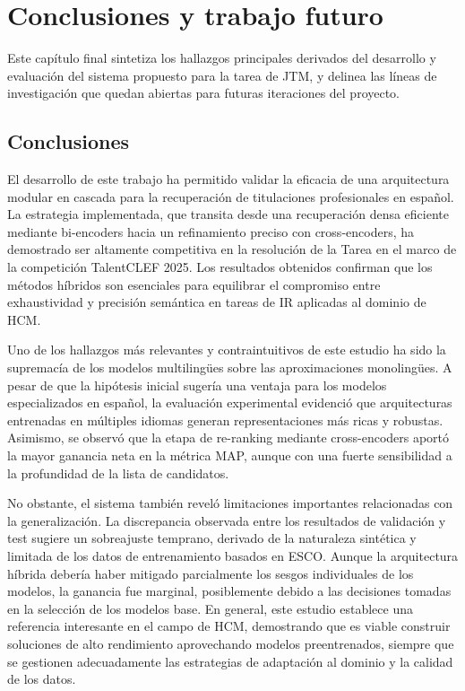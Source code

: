
\chapter{Conclusiones y trabajo futuro}
\label{ch:Conclusiones}

\noindent Este capítulo final sintetiza los hallazgos principales derivados del desarrollo y evaluación del sistema propuesto para la tarea de \gls{JTM}, y delinea las líneas de investigación que quedan abiertas para futuras iteraciones del proyecto.

\section{Conclusiones}
\label{sec:Conclu}

\noindent El desarrollo de este trabajo ha permitido validar la eficacia de una arquitectura modular en cascada para la recuperación de titulaciones profesionales en español. La estrategia implementada, que transita desde una recuperación densa eficiente mediante bi-encoders hacia un refinamiento preciso con cross-encoders, ha demostrado ser altamente competitiva en la resolución de la \gls{Tarea} en el marco de la competición TalentCLEF 2025. Los resultados obtenidos confirman que los métodos híbridos son esenciales para equilibrar el compromiso entre exhaustividad y precisión semántica en tareas de \gls{IR} aplicadas al dominio de \gls{HCM}.

Uno de los hallazgos más relevantes y contraintuitivos de este estudio ha sido la supremacía de los modelos multilingües sobre las aproximaciones monolingües. A pesar de que la hipótesis inicial sugería una ventaja para los modelos especializados en español, la evaluación experimental evidenció que arquitecturas entrenadas en múltiples idiomas generan representaciones más ricas y robustas. Asimismo, se observó que la etapa de re-ranking mediante cross-encoders aportó la mayor ganancia neta en la métrica \gls{MAP}, aunque con una fuerte sensibilidad a la profundidad de la lista de candidatos.

No obstante, el sistema también reveló limitaciones importantes relacionadas con la generalización. La discrepancia observada entre los resultados de validación y test sugiere un sobreajuste temprano, derivado de la naturaleza sintética y limitada de los datos de entrenamiento basados en \gls{ESCO}. Aunque la arquitectura híbrida debería haber mitigado parcialmente los sesgos individuales de los modelos, la ganancia fue marginal, posiblemente debido a las decisiones tomadas en la selección de los modelos base. En general, este estudio establece una referencia interesante en el campo de \gls{HCM}, demostrando que es viable construir soluciones de alto rendimiento aprovechando modelos preentrenados, siempre que se gestionen adecuadamente las estrategias de adaptación al dominio y la calidad de los datos.

